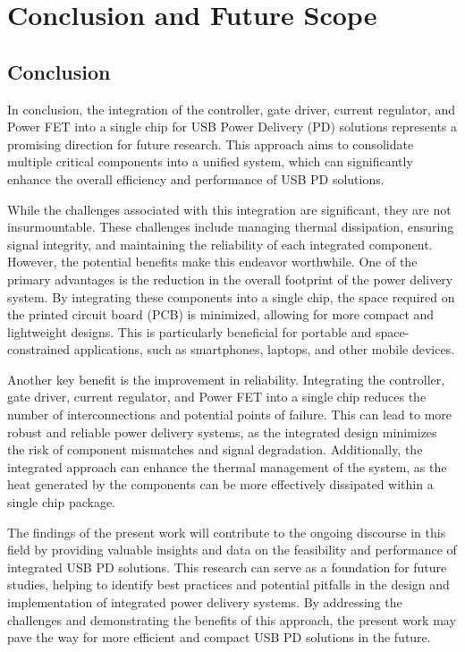 \chapter{Conclusion and Future Scope}

\section{Conclusion}
In conclusion, the integration of the controller, gate driver, current regulator, and Power FET into a single chip for USB Power Delivery (PD) solutions represents a promising direction for future research. This approach aims to consolidate multiple critical components into a unified system, which can significantly enhance the overall efficiency and performance of USB PD solutions.

While the challenges associated with this integration are significant, they are not insurmountable. These challenges include managing thermal dissipation, ensuring signal integrity, and maintaining the reliability of each integrated component. However, the potential benefits make this endeavor worthwhile. One of the primary advantages is the reduction in the overall footprint of the power delivery system. By integrating these components into a single chip, the space required on the printed circuit board (PCB) is minimized, allowing for more compact and lightweight designs. This is particularly beneficial for portable and space-constrained applications, such as smartphones, laptops, and other mobile devices.

Another key benefit is the improvement in reliability. Integrating the controller, gate driver, current regulator, and Power FET into a single chip reduces the number of interconnections and potential points of failure. This can lead to more robust and reliable power delivery systems, as the integrated design minimizes the risk of component mismatches and signal degradation. Additionally, the integrated approach can enhance the thermal management of the system, as the heat generated by the components can be more effectively dissipated within a single chip package.

The findings of the present work will contribute to the ongoing discourse in this field by providing valuable insights and data on the feasibility and performance of integrated USB PD solutions. This research can serve as a foundation for future studies, helping to identify best practices and potential pitfalls in the design and implementation of integrated power delivery systems. By addressing the challenges and demonstrating the benefits of this approach, the present work may pave the way for more efficient and compact USB PD solutions in the future.

